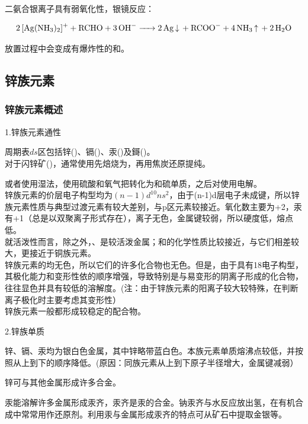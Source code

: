 \documentclass[a4paper,UTF8]{article}
\begin{document}
二氨合银离子具有弱氧化性，银镜反应：

$$ \ce{2[Ag(NH3)2]+ + RCHO + 3OH- -> 2Ag\ce{v} + RCOO- + 4NH3\ce{^} + 2H2O} $$

放置过程中会变成有爆炸性的和。

\subsection{锌族元素}

\subsubsection{锌族元素概述}

1.锌族元素通性

周期表$ds$区包括锌()、镉()、汞()及鎶()。\\

对于闪锌矿()，通常使用先焙烧为，再用焦炭还原提纯。

或者使用湿法，使用硫酸和氧气把转化为和硫单质，之后对使用电解。\\

锌族元素的价层电子构型均为$(n-1)d^{10}ns^{2}$，由于(n-1)d层电子未成键，所以锌族元素性质与典型过渡元素有较大差别，与p区元素较接近。氧化数主要为+2，汞有+1（总是以双聚离子形式存在），离子无色，金属键较弱，所以硬度低，熔点低。\\

就活泼性而言，除之外，、是较活泼金属；和的化学性质比较接近，与它们相差较大，更接近于铜族元素。\\

锌族元素的均无色，所以它们的许多化合物也无色。但是，由于具有18电子构型，其极化能力和变形性依的顺序增强，导致特别是与易变形的阴离子形成的化合物，往往显色并具有较低的溶解度。(注：由于锌族元素的阳离子较大较特殊，在判断离子极化时主要考虑其变形性）\\

锌族元素一般都形成较稳定的配合物。

2.锌族单质

锌、镉、汞均为银白色金属，其中锌略带蓝白色。本族元素单质熔沸点较低，并按照从上到下的顺序降低。(原因：同族元素从上到下原子半径增大，金属键减弱）

锌可与其他金属形成许多合金。

汞能溶解许多金属形成汞齐，汞齐是汞的合金。钠汞齐与水反应放出氢，在有机合成中常常用作还原剂。利用汞与金属形成汞齐的特点可从矿石中提取金银等。
\end{document}
